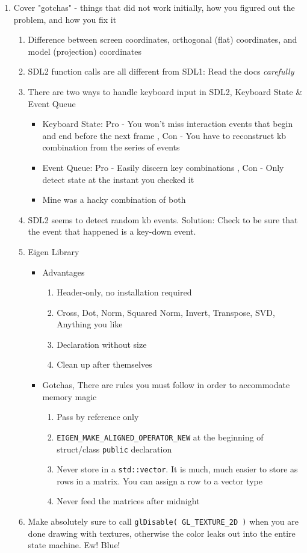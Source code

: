 \documentclass{hw_grad}
\begin{document}
\begin{enumerate}
		\item Cover "gotchas" - things that did not work initially, how you figured out the problem, and how you fix it
		\begin{enumerate}
			\item Difference between screen coordinates, orthogonal (flat) coordinates, and model (projection) coordinates
			\item SDL2 function calls are all different from SDL1: Read the docs \textit{carefully}
			\item There are two ways to handle keyboard input in SDL2, Keyboard State \& Event Queue
			\begin{itemize}
				\item Keyboard State: Pro - You won't miss interaction events that begin and end before the next frame , Con - You have to reconstruct kb combination from the series of events
				\item Event Queue: Pro - Easily discern key combinations , Con - Only detect state at the instant you checked it
				\item Mine was a hacky combination of both
			\end{itemize}
			\item SDL2 seems to detect random kb events.  Solution: Check to be sure that the event that happened is a key-down event.
			\item Eigen Library
			\begin{itemize}
				\item Advantages
				\begin{enumerate}
					\item Header-only, no installation required
					\item Cross, Dot, Norm, Squared Norm, Invert, Transpose, SVD, Anything you like
					\item Declaration without size
					\item Clean up after themselves
				\end{enumerate}
				\item Gotchas, There are rules you must follow in order to accommodate memory magic
				\begin{enumerate}
					\item Pass by reference only
					\item {\tt EIGEN\_MAKE\_ALIGNED\_OPERATOR\_NEW} at the beginning of struct/class {\tt public} declaration
					\item Never store in a {\tt std::vector}. \larw It is much, much easier to store as rows in a matrix.  You can assign a row to a vector type
					\item Never feed the matrices after midnight
				\end{enumerate}
			\end{itemize}
			\item Make absolutely sure to call {\tt glDisable( GL\_TEXTURE\_2D )} when you are done drawing with textures, otherwise the color leaks out into the entire state machine. Ew! Blue!
		\end{enumerate}
		
	\end{enumerate}
	
	
	
\end{document}

